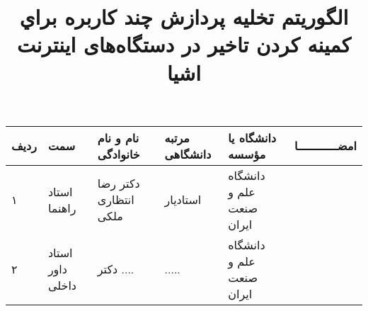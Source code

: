 \subject{مهندسی کامپیوتر}
\title{الگوريتم تخليه پردازش چند كاربره براي كمينه كردن تاخير در دستگاه‌های اينترنت اشيا}

\def \CurrentProject {پروژه‌ی فعلی }
\firstPage
\besmPage
\davaranPage

\begin{center}
\begin{tabular}{| p{8mm} | p{18mm} | p{} |p{14mm}|p{}|c|}
\hline
ردیف	& سمت & نام و نام خانوادگی & مرتبه \newline دانشگاهی &	دانشگاه یا مؤسسه & امضــــــــــــا\\
\hline
۱  & استاد راهنما & دکتر \newline رضا انتظاری ملکی 
& استادیار & دانشگاه \newline علم و صنعت ایران &  \\
\hline
۲ & استاد داور \newline داخلی	 & دکتر \newline ....  & ..... & 
دانشگاه  \newline علم ‌و صنعت ایران & \\
\hline

\end{tabular}
\end{center}

